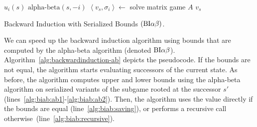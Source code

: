 \begin{algorithm2e}[t]
\small
{}
 {\Return $u_i(s)$} \label{alg:biab:stop1}
 {\Return $\textrm{alpha-beta}(s,-i)$} \label{alg:biab:stop15}
$\left\langle v_s, \sigma_i \right\rangle \leftarrow$ solve matrix game $A$\;
\Return $v_s$ \label{alg:biab:stop2}
\caption{Backward Induction with Serialized Bounds $(\textrm{BI}\alpha\beta)$.}\label{alg:backwardinduction-ab}
\end{algorithm2e}

We can speed up the backward induction algorithm using bounds that are computed by the alpha-beta algorithm (denoted $\textrm{BI}\alpha\beta$).
Algorithm~\ref{alg:backwardinduction-ab} depicts the pseudocode.
If the bounds are not equal, the algorithm starts evaluating successors of the current state.
As before, the algorithm computes upper and lower bounds using the alpha-beta algorithm on serialized variants of the
subgame rooted at the successor $s'$ (lines~\ref{alg:biab:ab1}-\ref{alg:biab:ab2}).
Then, the algorithm uses the value directly if the bounds are equal (line~\ref{alg:biab:saving}), or performs a
recursive call otherwise~(line~\ref{alg:biab:recursive}).

